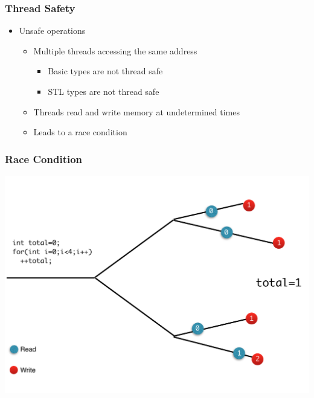 \documentclass[fleqn,xcolor=table,10pt,final]{beamer}
\begin{document}
\begin{frame}
  \frametitle{Thread Safety}
  \begin{itemize}
    \item Unsafe operations
      \begin{itemize}
        \item Multiple threads accessing the same address
          \begin{itemize}
            \item Basic types are not thread safe
            \item STL types are not thread safe
          \end{itemize}
        \item Threads read and write memory at undetermined times
        \item Leads to a race condition
      \end{itemize}
  \end{itemize}
\end{frame}

\begin{frame}
  \frametitle{Race Condition}
  \includegraphics[width=\textwidth]{figures/race}
\end{frame}
\end{document}
